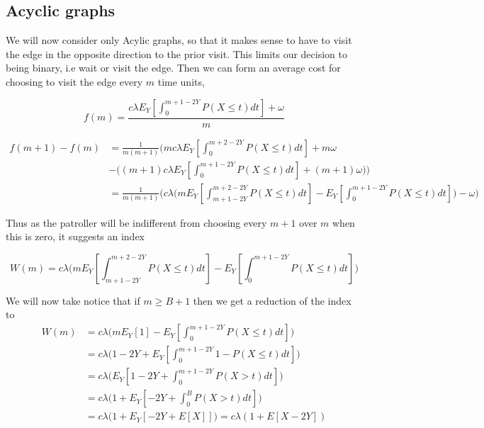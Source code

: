 \documentclass[a4paper,10pt]{article}
\theoremstyle{definition}
\theoremstyle{definition}
\theoremstyle{remark}
\theoremstyle{definition}
\begin{document}
\subsection{Acyclic graphs}
We will now consider only Acylic graphs, so that it makes sense to have to visit the edge in the opposite direction to the prior visit. This limits our decision to being binary, i.e wait or visit the edge. Then we can form an average cost for choosing to visit the edge every $m$ time units,

\begin{equation}
f(m)=\frac{c \lambda E_{Y}\left[\int_{0}^{m+1-2Y} P(X \leq t) dt \right] + \omega}{m}
\end{equation}

\begin{align*}
f(m+1)-f(m) &= \frac{1}{m(m+1)} \Bigg(mc \lambda E_{Y} \left[\int_{0}^{m+2-2Y} P(X \leq t) dt \right] +m \omega \\
&- \bigg( (m+1)c \lambda E_{Y} \left[\int_{0}^{m+1-2Y} P(X \leq t) dt \right] +(m+1) \omega \bigg) \Bigg) \\
&=\frac{1}{m(m+1)} \Bigg( c \lambda \Bigg(mE_{Y} \left[\int_{m+1-2Y}^{m+2-2Y} P(X \leq t) dt \right] - E_{Y} \left[\int_{0}^{m+1-2Y} P(X \leq t) dt \right] \Bigg) -\omega \Bigg)
\end{align*}

Thus as the patroller will be indifferent from choosing every $m+1$ over $m$ when this is zero, it suggests an index

\begin{equation}
W(m)=c \lambda \Bigg(mE_{Y} \left[\int_{m+1-2Y}^{m+2-2Y} P(X \leq t) dt \right] - E_{Y} \left[\int_{0}^{m+1-2Y} P(X \leq t) dt \right] \Bigg)
\end{equation}

We will now take notice that if $m \geq B+1$ then we get a reduction of the index to
\begin{align}
W(m)&=c \lambda \Bigg(mE_{Y} [1] - E_{Y} \left[\int_{0}^{m+1-2Y} P(X \leq t) dt \right] \Bigg) \nonumber \\
&= c \lambda \Bigg(1-2Y+E_{Y} \left[\int_{0}^{m+1-2Y} 1-P(X \leq t) dt \right] \Bigg) \nonumber \\
&= c \lambda \Bigg(E_{Y} \left[1-2Y+\int_{0}^{m+1-2Y} P(X > t) dt \right] \Bigg) \nonumber \\
&= c \lambda \Bigg(1+E_{Y} \left[-2Y+\int_{0}^{B} P(X > t) dt \right] \Bigg) \nonumber \\
&= c \lambda \Bigg(1+E_{Y} [-2Y +E[X]] \Bigg)=c \lambda (1+E[X-2Y])
\end{align}
\end{document}
